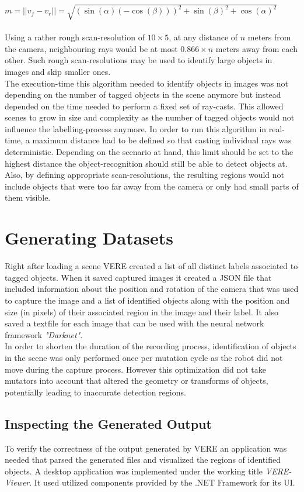 $m = || v_f - v_r || = \sqrt{(\sin(\alpha) (-\cos(\beta)))^2 + \sin(\beta)^2 + \cos(\alpha)^2}$\\\\
Using a rather rough scan-resolution of $10 \times 5$, at any distance of $n$ meters from the camera, neighbouring rays would be at most $0.866 \times n$ meters away from each other. Such rough scan-resolutions may be used to identify large objects in images and skip smaller ones.\\
The execution-time this algorithm needed to identify objects in images was not depending on the number of tagged objects in the scene anymore but instead depended on the time needed to perform a fixed set of ray-casts. This allowed scenes to grow in size and complexity as the number of tagged objects would not influence the labelling-process anymore. In order to run this algorithm in real-time, a maximum distance had to be defined so that casting individual rays was deterministic. Depending on the scenario at hand, this limit should be set to the highest distance the object-recognition should still be able to detect objects at. Also, by defining appropriate scan-resolutions, the resulting regions would not include objects that were too far away from the camera or only had small parts of them visible.

\section{Generating Datasets}
Right after loading a scene \ac{VERE} created a list of all distinct labels associated to tagged objects. When it saved captured images it created a JSON file that included information about the position and rotation of the camera that was used to capture the image and a list of identified objects along with the position and size (in pixels) of their associated region in the image and their label. It also saved a textfile for each image that can be used with the neural network framework \textit{"Darknet"}.\\
In order to shorten the duration of the recording process, identification of objects in the scene was only performed once per mutation cycle as the robot did not move during the capture process. However this optimization did not take mutators into account that altered the geometry or transforms of objects, potentially leading to inaccurate detection regions.

\subsection{Inspecting the Generated Output}
To verify the correctness of the output generated by \ac{VERE} an application was needed that parsed the generated files and visualized the regions of identified objects. A desktop application was implemented under the working title \textit{VERE-Viewer}. It used utilized components provided by the .NET Framework for its UI.

